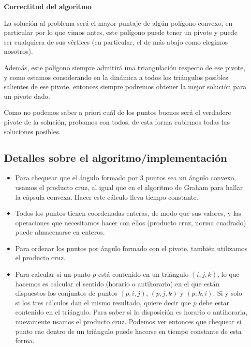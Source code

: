\textbf{Correctitud del algoritmo}

La solución al problema será el mayor puntaje de algún polígono convexo, 
en particular por lo que vimos antes, este polígono puede tener un pivote y puede 
ser cualquiera de sus vértices (en particular, el de más abajo como elegimos nosotros). 

Además, este polígono siempre admitirá una triangulación respecto de ese pivote, y como 
estamos considerando en la dinámica a todos los triángulos posibles salientes de ese pivote, entonces 
siempre podremos obtener la mejor solución para un pivote dado. 

Como no podemos saber a priori cuál de los puntos buenos será el verdadero pivote de la solución, 
probamos con todos, de esta forma cubirmos todas las soluciones posibles. 

\subsection{Detalles sobre el algoritmo/implementación}
\begin{itemize}
\item Para chequear que el ángulo formado por 3 puntos sea un ángulo convexo, usamos 
el producto cruz, al igual que en el algoritmo de Graham para hallar la cápsula convexa. 
Hacer este cálculo lleva tiempo constante. 
\item Todos los puntos tienen coordenadas enteras, de modo que sus valores, y 
las operaciones que necesitamos hacer con ellos (producto cruz, norma cuadrado) puede almacenarse 
en enteros. 
\item Para ordenar los puntos por ángulo formado con el pivote, también utilizamos el producto 
cruz. 
\item Para calcular si un punto $p$ está contenido en un triángulo $(i,j,k)$, lo que hacemos 
es calcular el sentido (horario o antihorario) en el que están dispuestos los conjuntos de puntos 
$(p,i,j)$, $(p,j,k)$ y $(p,k,i)$. Si y solo si los tres cálculos dan el mismo resultado, quiere 
decir que $p$ debe estar contenido en el triángulo. Para saber si la disposición es horario o antihoraria, 
nuevamente usamos el producto cruz. Podemos ver entonces que chequear si punto cae dentro de un triángulo 
puede hacerse en tiempo constante de esta forma. 
\end{itemize}

